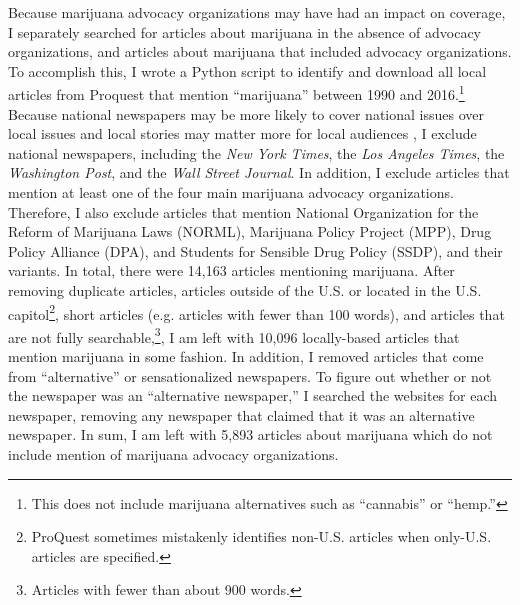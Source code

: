 Because marijuana advocacy organizations may have had an impact on coverage, I separately searched for articles about marijuana in the absence of advocacy organizations, and articles about marijuana that included advocacy organizations. To accomplish this,  I wrote a Python script to identify and download all local articles from Proquest that mention ``marijuana'' between 1990 and 2016.\footnote{This does not include marijuana alternatives such as ``cannabis'' or ``hemp.''} Because national newspapers may be more likely to cover national issues over local issues \citep{earl_et_al_2004} and local stories may matter more for local audiences \citep{amenta_et_al_2012}, I exclude national newspapers, including the \textit{New York Times}, the \textit{Los Angeles Times}, the \textit{Washington Post}, and the \textit{Wall Street Journal}. In addition, I exclude articles that mention at least one of the four main marijuana advocacy organizations. Therefore, I also exclude articles that mention National Organization for the Reform of Marijuana Laws (NORML), Marijuana Policy Project (MPP), Drug Policy Alliance (DPA), and Students for Sensible Drug Policy (SSDP), and their variants. In total, there were 14,163 articles mentioning marijuana. After removing duplicate articles, articles outside of the U.S. or located in the U.S. capitol\footnote{ProQuest sometimes mistakenly identifies non-U.S. articles when only-U.S. articles are specified.}, short articles (e.g. articles with fewer than 100 words), and articles that are not fully searchable,\footnote{Articles with fewer than about 900 words.}, I am left with 10,096 locally-based articles that mention marijuana in some fashion. In addition, I removed articles that come from ``alternative'' or sensationalized newspapers. To figure out whether or not the newspaper was an ``alternative newspaper,'' I searched the websites for each newspaper, removing any newspaper that claimed that it was an alternative newspaper. In sum, I am left with  5,893 articles about marijuana which do not include mention of marijuana advocacy organizations. %


